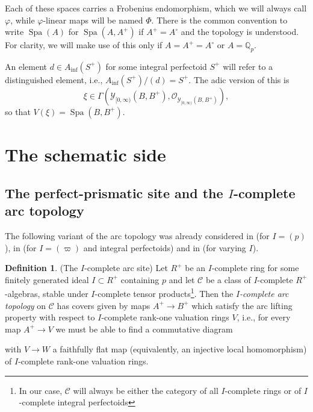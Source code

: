 \documentclass[10pt,twoside]{article}
\numberwithin{equation}{section}
\theoremstyle{plain}
\theoremstyle{definition}
\newtheorem{mydef}[mythm]{Definition}
\DeclareMathOperator{\Spa}{Spa}
\newcommand{\QQ}{\mathbb{Q}}
\newcommand{\MCC}{\mathcal{C}}
\newcommand{\MCO}{\mathcal{O}}
\newcommand{\MCY}{\mathcal{Y}}
\let \phi \varphi
\DeclareMathOperator{\Inf}{inf}
\newcommand{\Ainf}{A_{\Inf}}
\newcommand{\Yco}{\MCY_{[0,\infty)}}
\begin{document}
Each of these spaces carries a Frobenius endomorphism, which we will always call \(\phi\), while \(\phi\)-linear maps will be named \(\Phi\). There is the common convention to write \(\Spa(A)\) for \(\Spa(A,A^+)\) if \(A^+=A^\circ\) and the topology is understood. For clarity, we will make use of this only if \(A=A^+=A^\circ\) or \(A=\QQ_p\).\par
An element \(d\in \Ainf(S^+)\) for some integral perfectoid \(S^+\) will refer to a distinguished element, i.e., \(\Ainf(S^+)/(d)=S^+\). The adic version of this is 
    \[\xi\in \Gamma(\Yco(B,B^+),\MCO_{\Yco(B,B^+)}),\]
    so that \(V(\xi)=\Spa(B,B^+)\).

\newpage

\section{The schematic side}
\subsection {\texorpdfstring{The perfect-prismatic site and the \(I\)-complete arc topology}
  {The perfect-prismatic site and the I-complete arc topology}}
The following variant of the arc topology was already considered in \cite{BS21} (for \(I=(p)\)), in \cite{Ito} (for \(I=(\varpi)\) and integral perfectoids) and in \cite[Section 4.3]{Takaya} (for varying \(I\)).

\begin{mydef}\label{defArcSite}(The \(I\)-complete arc site)
Let \(R^+\) be an \(I\)-complete ring for some finitely generated ideal \(I\subset R^+\) containing \(p\) and let \(\MCC\) be a class of \(I\)-complete \(R^+\)-algebras, stable under \(I\)-complete tensor products\footnote{In our case, \(\MCC\) will always be either the category of all \(I\)-complete rings or of \(I\)-complete integral perfectoids}. Then the \emph{\(I\)-complete arc topology} on \(\MCC\) has covers given by maps \(A^+\to B^+\) which satisfy the arc lifting property with respect to \(I\)-complete rank-one valuation rings \(V\), i.e., for every map \(A^+\to V\) we must be able to find a commutative diagram

\begin{center}
\end{center}

with \(V\to W\) a faithfully flat map (equivalently, an injective local homomorphism) of \(I\)-complete rank-one valuation rings.
\end{mydef}
\end{document}
